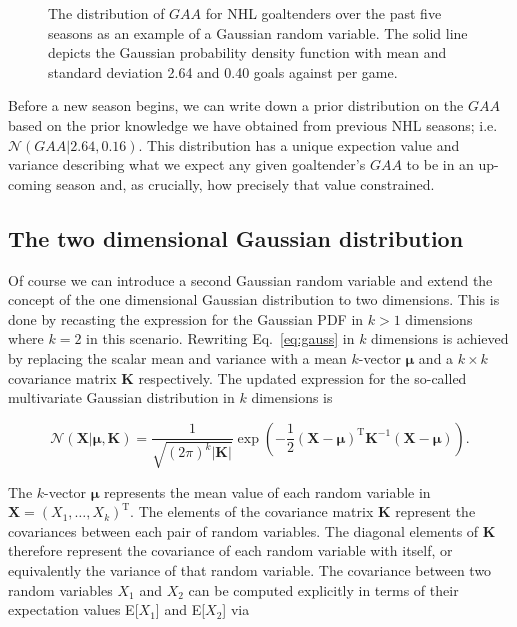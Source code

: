 \begin{figure}
  \centering
  \caption[Gaussian random variable in one dimension.]
      {The distribution of $GAA$ for NHL goaltenders over the past five
    seasons as an example of a Gaussian random variable. The solid line depicts
    the Gaussian probability density function with mean and standard
    deviation 2.64 and 0.40 goals against per game.}
  \label{fig:gaa1d}
\end{figure}

Before a new season begins, we can write down a prior distribution on the $GAA$
based on the prior knowledge we have obtained from previous NHL seasons; i.e.
$\mathcal{N}(GAA|2.64,0.16)$. This distribution has a unique expection value and
variance describing what we expect any given goaltender's $GAA$ to be in an
up-coming season and, as crucially, how precisely that value constrained.

\subsection{The two dimensional Gaussian distribution}
Of course we can introduce a second Gaussian random variable and extend the 
concept of the one dimensional Gaussian distribution to two dimensions. This is done
by recasting the expression for the Gaussian PDF in $k>1$
dimensions where $k=2$ in this scenario. Rewriting Eq.~\ref{eq:gauss} in $k$
dimensions is achieved by replacing the scalar mean and variance with a mean
$k$-vector $\boldsymbol{\mu}$ and a $k \times k$ covariance matrix $\mathbf{K}$
respectively. The updated expression for the so-called multivariate Gaussian
distribution in $k$ dimensions is

\begin{equation}
  \mathcal{N}(\mathbf{X}|\boldsymbol{\mu},\mathbf{K}) = \frac{1}{\sqrt{(2\pi)^k
      |\mathbf{K}|}} \exp{\left( -\frac{1}{2} (\mathbf{X} -
    \boldsymbol{\mu})^{\text{T}} \mathbf{K}^{-1} (\mathbf{X}-\boldsymbol{\mu})
    \right)}.
  \label{eq:gauss2d}
\end{equation}

\noindent The $k$-vector $\boldsymbol{\mu}$ represents the mean value of each
random variable in $\mathbf{X}=(X_1,\dots,X_k)^{\text{T}}$.
The elements of the covariance matrix
$\mathbf{K}$ represent the covariances between each pair of random variables.
The diagonal elements of $\mathbf{K}$ therefore represent the covariance of each
random variable with itself, or equivalently the variance of that random variable.
The covariance between two random variables $X_1$ and $X_2$ can be computed explicitly
in terms of their expectation values E[$X_1$] and E[$X_2$] via

